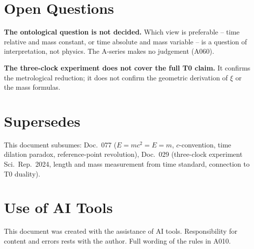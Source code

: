 \section{Open Questions}

\textbf{The ontological question is not decided.} Which view is preferable --
time relative and mass constant, or time absolute and mass variable -- is a
question of interpretation, not physics. The A-series makes no judgement (A060).

\textbf{The three-clock experiment does not cover the full T0 claim.} It confirms
the metrological reduction; it does not confirm the geometric derivation of $\xi$
or the mass formulas.

\section{Supersedes}

This document subsumes: Doc.~077 ($E=mc^2=E=m$, $c$-convention, time dilation
paradox, reference-point revolution), Doc.~029 (three-clock experiment Sci.\ Rep.\
2024, length and mass measurement from time standard, connection to T0 duality).

\section{Use of AI Tools}

This document was created with the assistance of AI tools. Responsibility
for content and errors rests with the author. Full wording of the rules in A010.
